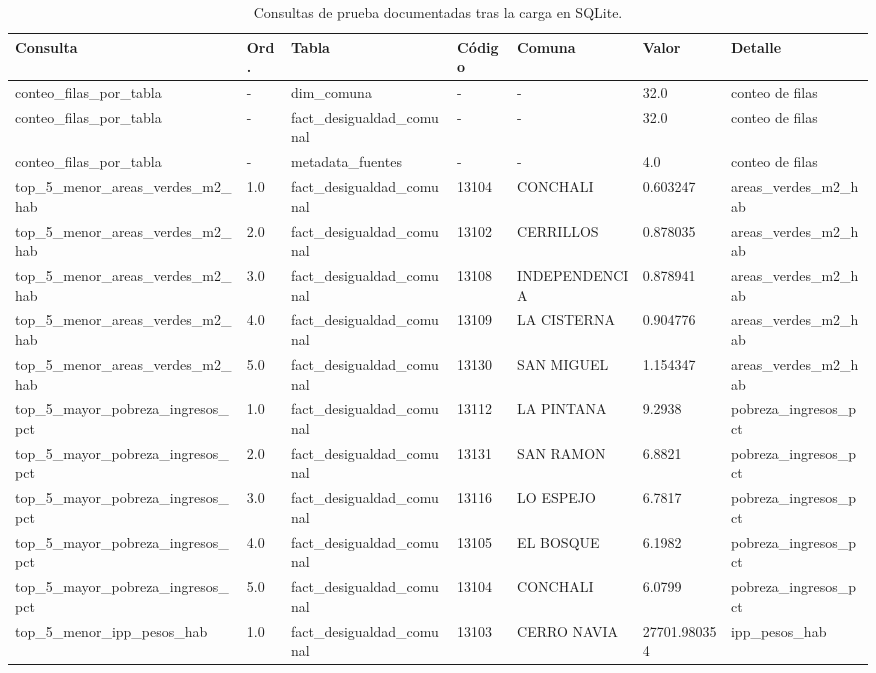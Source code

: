 \begin{table}[htbp]
\centering
\scriptsize
\caption{Consultas de prueba documentadas tras la carga en SQLite.}
\begin{tabular}{|p{3.2cm}|p{0.9cm}|p{3.0cm}|p{1.2cm}|p{2.8cm}|p{2.3cm}|p{1.8cm}|}
\hline
Consulta & Ord. & Tabla & Código & Comuna & Valor & Detalle \\
\hline
conteo\_filas\_por\_tabla & - & dim\_comuna & - & - & 32.0 & conteo de filas \\
conteo\_filas\_por\_tabla & - & fact\_desigualdad\_comunal & - & - & 32.0 & conteo de filas \\
conteo\_filas\_por\_tabla & - & metadata\_fuentes & - & - & 4.0 & conteo de filas \\
top\_5\_menor\_areas\_verdes\_m2\_hab & 1.0 & fact\_desigualdad\_comunal & 13104 & CONCHALI & 0.603247 & areas\_verdes\_m2\_hab \\
top\_5\_menor\_areas\_verdes\_m2\_hab & 2.0 & fact\_desigualdad\_comunal & 13102 & CERRILLOS & 0.878035 & areas\_verdes\_m2\_hab \\
top\_5\_menor\_areas\_verdes\_m2\_hab & 3.0 & fact\_desigualdad\_comunal & 13108 & INDEPENDENCIA & 0.878941 & areas\_verdes\_m2\_hab \\
top\_5\_menor\_areas\_verdes\_m2\_hab & 4.0 & fact\_desigualdad\_comunal & 13109 & LA CISTERNA & 0.904776 & areas\_verdes\_m2\_hab \\
top\_5\_menor\_areas\_verdes\_m2\_hab & 5.0 & fact\_desigualdad\_comunal & 13130 & SAN MIGUEL & 1.154347 & areas\_verdes\_m2\_hab \\
top\_5\_mayor\_pobreza\_ingresos\_pct & 1.0 & fact\_desigualdad\_comunal & 13112 & LA PINTANA & 9.2938 & pobreza\_ingresos\_pct \\
top\_5\_mayor\_pobreza\_ingresos\_pct & 2.0 & fact\_desigualdad\_comunal & 13131 & SAN RAMON & 6.8821 & pobreza\_ingresos\_pct \\
top\_5\_mayor\_pobreza\_ingresos\_pct & 3.0 & fact\_desigualdad\_comunal & 13116 & LO ESPEJO & 6.7817 & pobreza\_ingresos\_pct \\
top\_5\_mayor\_pobreza\_ingresos\_pct & 4.0 & fact\_desigualdad\_comunal & 13105 & EL BOSQUE & 6.1982 & pobreza\_ingresos\_pct \\
top\_5\_mayor\_pobreza\_ingresos\_pct & 5.0 & fact\_desigualdad\_comunal & 13104 & CONCHALI & 6.0799 & pobreza\_ingresos\_pct \\
top\_5\_menor\_ipp\_pesos\_hab & 1.0 & fact\_desigualdad\_comunal & 13103 & CERRO NAVIA & 27701.980354 & ipp\_pesos\_hab \\

\end{tabular}
\end{table}
